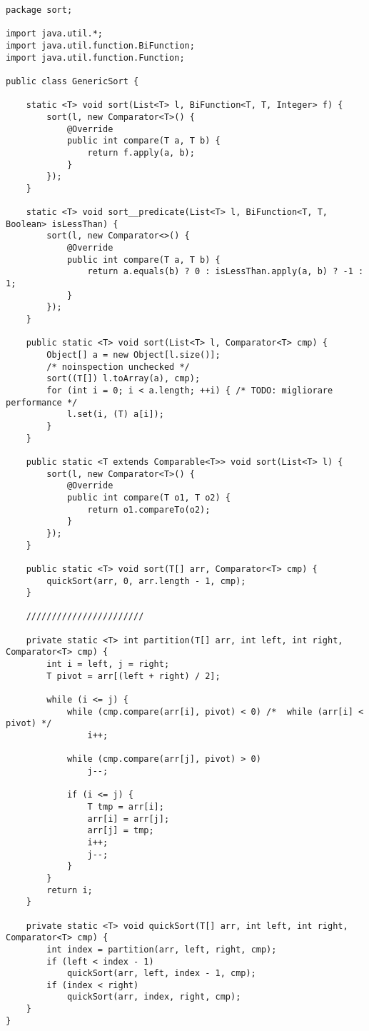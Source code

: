 \begin{lstlisting}
package sort;

import java.util.*;
import java.util.function.BiFunction;
import java.util.function.Function;

public class GenericSort {

    static <T> void sort(List<T> l, BiFunction<T, T, Integer> f) {
        sort(l, new Comparator<T>() {
            @Override
            public int compare(T a, T b) {
                return f.apply(a, b);
            }
        });
    }

    static <T> void sort__predicate(List<T> l, BiFunction<T, T, Boolean> isLessThan) {
        sort(l, new Comparator<>() {
            @Override
            public int compare(T a, T b) {
                return a.equals(b) ? 0 : isLessThan.apply(a, b) ? -1 : 1;
            }
        });
    }

    public static <T> void sort(List<T> l, Comparator<T> cmp) {
        Object[] a = new Object[l.size()];
        /* noinspection unchecked */
        sort((T[]) l.toArray(a), cmp);
        for (int i = 0; i < a.length; ++i) { /* TODO: migliorare performance */
            l.set(i, (T) a[i]);
        }
    }

    public static <T extends Comparable<T>> void sort(List<T> l) {
        sort(l, new Comparator<T>() {
            @Override
            public int compare(T o1, T o2) {
                return o1.compareTo(o2);
            }
        });
    }

    public static <T> void sort(T[] arr, Comparator<T> cmp) {
        quickSort(arr, 0, arr.length - 1, cmp);
    }

    ///////////////////////

    private static <T> int partition(T[] arr, int left, int right, Comparator<T> cmp) {
        int i = left, j = right;
        T pivot = arr[(left + right) / 2];

        while (i <= j) {
            while (cmp.compare(arr[i], pivot) < 0) /*  while (arr[i] < pivot) */
                i++;

            while (cmp.compare(arr[j], pivot) > 0)
                j--;

            if (i <= j) {
                T tmp = arr[i];
                arr[i] = arr[j];
                arr[j] = tmp;
                i++;
                j--;
            }
        }
        return i;
    }

    private static <T> void quickSort(T[] arr, int left, int right, Comparator<T> cmp) {
        int index = partition(arr, left, right, cmp);
        if (left < index - 1)
            quickSort(arr, left, index - 1, cmp);
        if (index < right)
            quickSort(arr, index, right, cmp);
    }
}
\end{lstlisting}
